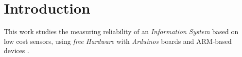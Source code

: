 
\chapter{Introduction}


This work studies the measuring reliability of an \textit{Information System} based on low cost sensors, using \textit{free Hardware} with \textit{Arduinos \cite{noauthor_arduino_nodate-1, jjtorres_hardware_2014}} boards and ARM-based devices \cite{ltd_leadership_nodate, ltd_-profile_nodate}.\\





